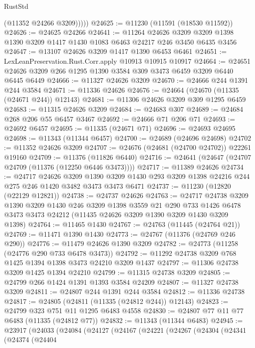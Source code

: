 \begin{lexlean}{RustStd}
\begin{coremodule}
{\begin{coremodule}
{{{{{{{{{{{{{{{{{{{{{{{{{{{{{{{{{{{{{{{{{{{{{{{{{{{{{{{{{{{{{{{{{{{{{{{{{{{{{{{{{{{{{            (@11352 @24266 @3209)))))
@24625 := @11230 (@11591 (@18530 @11592))
@24626 := @24625 @24266
@24641 := @11264
    @24626
    @3209
    @3209
    @1398
    @1390
    @3209
    @1417
    @1430
    @1083
    @6463
    @24217
    @246
    @3450
    @6435
    @3456
@24647 := @13107 @24626 @3209 @1417 @1390 @6453 @6461
@24651 := LexLeanPreservation.Rust.Corr.apply @10913 @10915 @10917
@24664 := @24651 @24626 @3209 @266 @1295 @1390 @3584 @309 @3473 @6459 @3209 @6440 @6445 @6449
@24666 := @11327 @24626 @3209
@24670 := @24666 @244 @1391 @244 @3584
@24671 := @11336 @24626
@24676 := @24664 (@24670 (@11335 (@24671 @244)) @12143)
@24681 := @11306 @24626 @3209 @309 @1295 @6459
@24683 := @11315 @24626 @3209
@24684 := @24683 @307
@24689 := @24684 @268 @206 @55 @6457 @3467
@24692 := @24666 @71 @206 @71
@24693 := @24692 @6457
@24695 := @11335 (@24671 @71)
@24696 := @24693 @24695
@24698 := @11343 (@11344 @6457)
@24700 := @24689 (@24696 @24698)
@24702 := @11352 @24626 @3209
@24707 := @24676 (@24681 (@24700 @24702)) @22261 @19160
@24709 := @11376 (@11826 @6440)
@24716 := @24641 (@24647 (@24707 @24709 (@11376 (@12250 @6446 @3473))))
@24717 := @11389 @24626
@24734 := @24717
    @24626
    @3209
    @1390
    @3209
    @1430
    @293
    @3209
    @1398
    @24216
    @244
    @275
    @246
    @1420
    @3482
    @3473
    @3473
    @6471
@24737 := @11230 (@12820 (@22129 @12821))
@24738 := @24737 @24626
@24763 := @24717
    @24738
    @3209
    @1390
    @3209
    @1430
    @246
    @3209
    @1398
    @3559
    @21
    @290
    @733
    @1426
    @6478
    @3473
    @3473
    @24212
    (@11435 @24626 @3209 @1390 @3209 @1430 @3209 @1398)
@24764 := @11465 @1430
@24767 := @24763 (@11445 (@24764 @21))
@24769 := @11471 @1390 @1430
@24773 := @24767 (@11376 (@24769 @246 @290))
@24776 := @11479 @24626 @1390 @3209
@24782 := @24773 (@11258 (@24776 @290 @733 @6478 @3473))
@24792 := @11292 @24738 @3209 @768 @1425 @1394 @1398 @3473 @24210 @3209 @1437
@24797 := @11306 @24738 @3209 @1425 @1394 @24210
@24799 := @11315 @24738 @3209
@24805 := @24799 @266 @1424 @1391 @1393 @3584 @24209
@24807 := @11327 @24738 @3209
@24811 := @24807 @244 @1391 @244 @3584
@24812 := @11336 @24738
@24817 := @24805 (@24811 (@11335 (@24812 @244)) @12143)
@24823 := @24799 @323 @751 @11 @1295 @6483 @4558
@24830 := @24807 @77 @11 @77 @6483 (@11335 (@24812 @77))
@24832 := @11343 (@11344 @6483)
@24945 := @23917
    (@24033
      (@24084
        (@24127
          (@24167
            (@24221
              (@24267
                (@24304
                  (@24341
                    (@24374
                      (@24404
}}}}}}}}}}}}}}}}}}}}}}}}}}}}}}}}}}}}}}}}}}}}}}}}}}}}}}}}}}}}}}}}}}}}}}}}}}}}}}}}}}}}}
\end{coremodule}}
\end{coremodule}
\end{lexlean}
